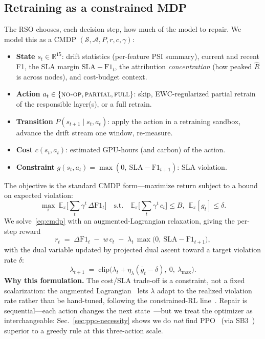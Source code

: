 \documentclass[conference]{IEEEtran}
\begin{document}
\subsection{Retraining as a constrained MDP}
The RSO chooses, each decision step, how much of the model to repair. We
model this as a CMDP $(\mathcal{S},\mathcal{A},P,r,c,\gamma)$:
\begin{itemize}
\item \textbf{State} $s_t\in\mathbb{R}^{15}$: drift statistics (per-feature
PSI summary), current and recent F1, the SLA margin $\mathrm{SLA}-\mathrm{F1}_t$,
the attribution \emph{concentration} (how peaked $\hat R$ is across nodes),
and cost-budget context.
\item \textbf{Action} $a_t\in\{\textsc{no-op},\textsc{partial},\textsc{full}\}$:
skip, EWC-regularized partial retrain of the responsible layer(s), or a
full retrain.
\item \textbf{Transition} $P(s_{t+1}\mid s_t,a_t)$: apply the action in a
retraining sandbox, advance the drift stream one window, re-measure.
\item \textbf{Cost} $c(s_t,a_t)$: estimated GPU-hours (and carbon) of the
action.
\item \textbf{Constraint} $g(s_t,a_t)=\max(0,\ \mathrm{SLA}-\mathrm{F1}_{t+1})$:
SLA violation.
\end{itemize}
The objective is the standard CMDP form---maximize return subject to a
bound on expected violation:
\begin{equation}
\max_{\pi}\ \mathbb{E}_\pi\!\Big[\textstyle\sum_t \gamma^t\,\Delta \mathrm{F1}_t\Big]
\quad\text{s.t.}\quad \mathbb{E}_\pi\!\Big[\textstyle\sum_t \gamma^t\,c_t\Big]\le B,\ \ \mathbb{E}_\pi[g_t]\le \delta .
\label{eq:cmdp}
\end{equation}
We solve~\eqref{eq:cmdp} with an augmented-Lagrangian relaxation, giving
the per-step reward
\begin{equation}
r_t \;=\; \Delta \mathrm{F1}_t \;-\; w\,c_t \;-\; \lambda_t\,\max\!\big(0,\ \mathrm{SLA}-\mathrm{F1}_{t+1}\big),
\label{eq:reward}
\end{equation}
with the dual variable updated by projected dual ascent toward a target
violation rate $\delta$:
\begin{equation}
\lambda_{t+1} \;=\; \mathrm{clip}\big(\lambda_t + \eta_\lambda(\bar g_t - \delta),\ 0,\ \lambda_{\max}\big).
\label{eq:dual}
\end{equation}
\textbf{Why this formulation.} The cost/SLA trade-off is a constraint, not
a fixed scalarization: the augmented
Lagrangian~\cite{bertsekas1996constrained} lets $\lambda$ adapt to the
realized violation rate rather than be hand-tuned, following the
constrained-RL
line~\cite{altman1999constrained,achiam2017cpo,tessler2019rcpo,chow2018lyapunov,ray2019safetygym}.
Repair is sequential---each action changes the next
state~\cite{sutton2018reinforcement}---but we treat the optimizer as
interchangeable: Sec.~\ref{sec:ppo-necessity} shows we do \emph{not} find
PPO~\cite{schulman2017ppo,schulman2016gae} (via SB3~\cite{raffin2021sb3})
superior to a greedy rule at this three-action scale.
\end{document}
